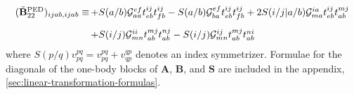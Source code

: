 \begin{equation}
    \begin{array}{r@{\,}l}
        (\tilde{\mathbf{B}}_{22}^\mathrm{PED})_{ijab,ijab}
        \equiv
        &
        +
        S(a/b)
        \mathcal{G}_{aa}^{ef}
        t_{eb}^{ij}
        t_{fb}^{ij}
        -
        S(a/b)
        \mathcal{G}_{ba}^{ef}
        t_{eb}^{ij}
        t_{fb}^{ij}
        +
        2
        S(i/j|a/b)
        \mathcal{G}_{ma}^{ia}
        t_{eb}^{ij}
        t_{ab}^{mj}
        \\[10pt]
        &
        +
        S(i/j)
        \mathcal{G}_{mn}^{ii}
        t_{ab}^{mj}
        t_{ab}^{nj}
        -
        S(i/j)
        \mathcal{G}_{mn}^{ij}
        t_{ab}^{mj}
        t_{ab}^{ni}
    \end{array}
\end{equation}
where \(S(p/q)v_{pq}^{pq} = v_{pq}^{pq} + v_{qp}^{qp}\) denotes an index
symmetrizer.
Formulae for the diagonals of the one-body blocks of \(\mathbf{A}\),
\(\mathbf{B}\), and \(\mathbf{S}\) are included in the appendix,
\cref{sec:linear-transformation-formulas}.



